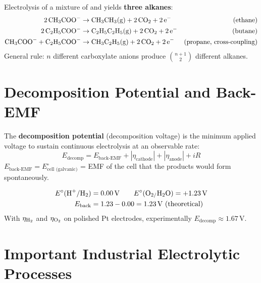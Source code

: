 \begin{examplebox}
Electrolysis of a mixture of  and  yields \textbf{three alkanes}:
\begin{align*}
\ce{2CH3COO^-} &\to \ce{CH3CH3(g) + 2CO2 + 2e-} & (\text{ethane})\\
\ce{2C2H5COO^-} &\to \ce{C2H5C2H5(g) + 2CO2 + 2e-} & (\text{butane})\\
\ce{CH3COO^- + C2H5COO^-} &\to \ce{CH3C2H5(g) + 2CO2 + 2e-} & (\text{propane, cross-coupling})
\end{align*}
General rule: $n$ different carboxylate anions produce $\binom{n+1}{2}$ different alkanes.
\end{examplebox}

\section{Decomposition Potential and Back-EMF}

The \textbf{decomposition potential} (decomposition voltage) is the minimum applied voltage to sustain continuous electrolysis at an observable rate:
\begin{equation}
    \boxed{E_{\text{decomp}} = E_{\text{back-EMF}} + |\eta_{\text{cathode}}| + |\eta_{\text{anode}}| + iR}
\end{equation}
$E_{\text{back-EMF}} = E^\circ_{\text{cell (galvanic)}}$ = EMF of the cell that the products would form spontaneously.

\begin{examplebox}
\begin{align*}
E^\circ(\ce{H+/H2}) &= 0.00\,\text{V} \qquad E^\circ(\ce{O2/H2O}) = +1.23\,\text{V}\\
E_{\text{back}} &= 1.23 - 0.00 = 1.23\,\text{V (theoretical)}
\end{align*}
With $\eta_{\ce{H2}}$ and $\eta_{\ce{O2}}$ on polished Pt electrodes, experimentally $E_{\text{decomp}} \approx 1.67\,\text{V}$.
\end{examplebox}

\section{Important Industrial Electrolytic Processes}

